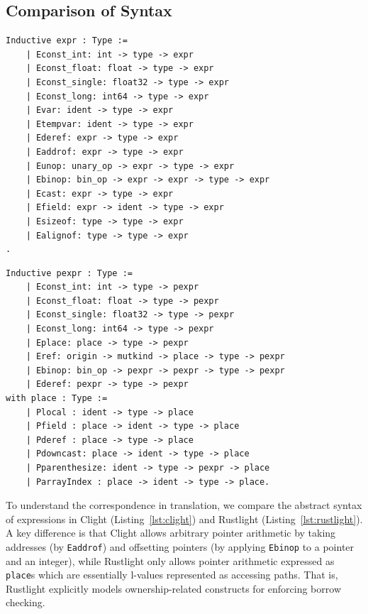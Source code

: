 \documentclass{llncs} %
\begin{document}
\subsection{Comparison of Syntax}
\label{sec:syntax_comparison}

\noindent
\begin{minipage}[t]{0.48\textwidth}
\vspace{-0.5cm}
\begin{lstlisting}[language=Coq, caption={Clight Expressions}, frame=tlrb, label={lst:clight}]
Inductive expr : Type :=
    | Econst_int: int -> type -> expr
    | Econst_float: float -> type -> expr
    | Econst_single: float32 -> type -> expr
    | Econst_long: int64 -> type -> expr
    | Evar: ident -> type -> expr
    | Etempvar: ident -> type -> expr
    | Ederef: expr -> type -> expr
    | Eaddrof: expr -> type -> expr
    | Eunop: unary_op -> expr -> type -> expr
    | Ebinop: bin_op -> expr -> expr -> type -> expr
    | Ecast: expr -> type -> expr
    | Efield: expr -> ident -> type -> expr
    | Esizeof: type -> type -> expr
    | Ealignof: type -> type -> expr
.
\end{lstlisting}
\end{minipage}
\hfill
\begin{minipage}[t]{0.48\textwidth}
\vspace{-0.5cm}
\begin{lstlisting}[language=Coq, caption={Rustlight Expressions}, frame=tlrb, label={lst:rustlight}]
Inductive pexpr : Type :=
    | Econst_int: int -> type -> pexpr
    | Econst_float: float -> type -> pexpr
    | Econst_single: float32 -> type -> pexpr
    | Econst_long: int64 -> type -> pexpr
    | Eplace: place -> type -> pexpr
    | Eref: origin -> mutkind -> place -> type -> pexpr
    | Ebinop: bin_op -> pexpr -> pexpr -> type -> pexpr
    | Ederef: pexpr -> type -> pexpr
with place : Type :=
    | Plocal : ident -> type -> place
    | Pfield : place -> ident -> type -> place
    | Pderef : place -> type -> place
    | Pdowncast: place -> ident -> type -> place
    | Pparenthesize: ident -> type -> pexpr -> place
    | ParrayIndex : place -> ident -> type -> place.
\end{lstlisting}
\end{minipage}

To understand the correspondence in translation, we compare the
abstract syntax of expressions in Clight (Listing~\ref{lst:clight})
and Rustlight (Listing~\ref{lst:rustlight}). A key difference is that
Clight allows arbitrary pointer arithmetic by taking addresses (by
\texttt{Eaddrof}) and offsetting pointers (by applying \texttt{Ebinop}
to a pointer and an integer), while Rustlight only allows pointer
arithmetic expressed as \texttt{place}s which are
essentially l-values represented as accessing paths.
%
That is, Rustlight explicitly models ownership-related constructs for
enforcing borrow checking.
\end{document}
